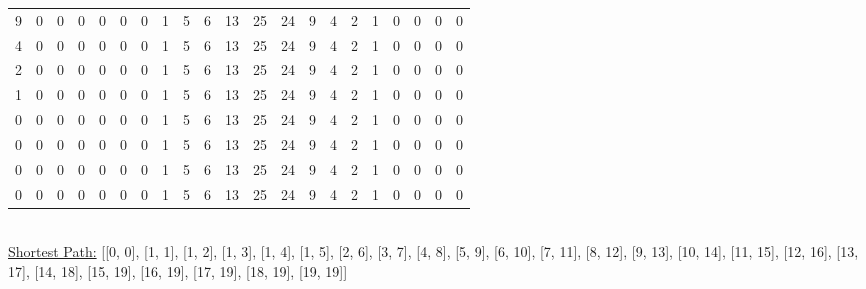 \begin{adjustbox}{width=\textwidth,totalheight=\textheight,keepaspectratio}
\begin{tabular}{l|llllllllllllllllllll}
    9         & 0  & 0  & 0  & 0  & 0  & 0  & 1  & 5  & 6  & 13 & 25 & 24 & 9  & 4  & 2  & 1  &\cellcolor[HTML]{EFEFEF} 0  & 0  & 0  & 0  \\
    4         & 0  & 0  & 0  & 0  & 0  & 0  & 1  & 5  & 6  & 13 & 25 & 24 & 9  & 4  & 2  & 1  & 0  &\cellcolor[HTML]{EFEFEF} 0  & 0  & 0  \\
    2         & 0  & 0  & 0  & 0  & 0  & 0  & 1  & 5  & 6  & 13 & 25 & 24 & 9  & 4  & 2  & 1  & 0  & 0  &\cellcolor[HTML]{EFEFEF} 0  & 0  \\
    1         & 0  & 0  & 0  & 0  & 0  & 0  & 1  & 5  & 6  & 13 & 25 & 24 & 9  & 4  & 2  & 1  & 0  & 0  & 0  &\cellcolor[HTML]{EFEFEF} 0  \\
    0         & 0  & 0  & 0  & 0  & 0  & 0  & 1  & 5  & 6  & 13 & 25 & 24 & 9  & 4  & 2  & 1  & 0  & 0  & 0  &\cellcolor[HTML]{EFEFEF} 0  \\
    0         & 0  & 0  & 0  & 0  & 0  & 0  & 1  & 5  & 6  & 13 & 25 & 24 & 9  & 4  & 2  & 1  & 0  & 0  & 0  &\cellcolor[HTML]{EFEFEF} 0  \\
    0         & 0  & 0  & 0  & 0  & 0  & 0  & 1  & 5  & 6  & 13 & 25 & 24 & 9  & 4  & 2  & 1  & 0  & 0  & 0  &\cellcolor[HTML]{EFEFEF} 0  \\
    0         & 0  & 0  & 0  & 0  & 0  & 0  & 1  & 5  & 6  & 13 & 25 & 24 & 9  & 4  & 2  & 1  & 0  & 0  & 0  &\cellcolor[HTML]{EFEFEF} 0  \\
    \end{tabular}
\end{adjustbox}\\

\underline{Shortest Path:} 
[[0, 0], [1, 1], [1, 2], [1, 3], [1, 4], [1, 5], [2, 6], [3, 7], [4, 8], [5, 9], [6, 10], [7, 11], [8, 12], [9, 13], [10, 14], [11, 15], [12, 16], [13, 17], [14, 18], [15, 19], [16, 19], [17, 19], [18, 19], [19, 19]]
%